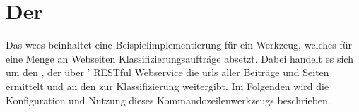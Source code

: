 \section{Der {\wordpressCrawler}}
    \label{section:solutionDetailsCrawler}
    Das \gls{wccs} beinhaltet eine Beispielimplementierung für ein Werkzeug,
    welches für eine Menge an Webseiten Klassifizierungsaufträge absetzt.
    Dabei handelt es sich um den {\wordpressCrawler},
    der über {\wordpress}' RESTful Webservice \cite{wordpress:RestAPI}
    die \glspl{url} aller Beiträge und Seiten ermittelt
    und an den {\classificationService}
    zur Klassifizierung weitergibt.
    Im Folgenden wird die Konfiguration und Nutzung dieses Kommandozeilenwerkzeugs beschrieben.

    
    